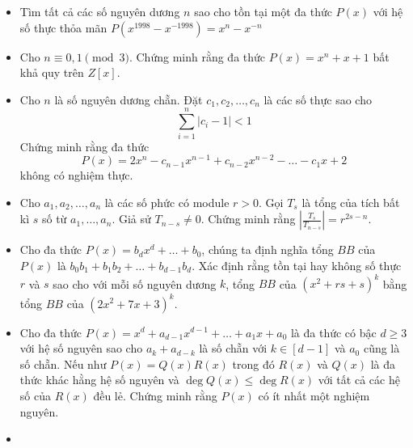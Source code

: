 \documentclass[11pt]{scrartcl}
\begin{document}
\begin{itemize}[label=, leftmargin=0em, itemsep=-0em]
        \item \begin{btvn}
            Tìm tất cả các số nguyên dương $n$ sao cho tồn tại một đa thức $P(x)$ với hệ số thực thỏa mãn $P(x^{1998} - x^{-1998}) = x^n - x^{-n}$
        \end{btvn}
        \item \begin{btvn}
            Cho $n \equiv 0,1 \pmod{3}$. Chứng minh rằng đa thức $P(x) = x^n + x + 1$ bất khả quy trên $Z[x]$.
        \end{btvn}
        \item \begin{btvn} Cho $n$ là số nguyên dương chẵn. Đặt $c_1,c_2,\dots,c_n$ là các số thực sao cho 
        \[
            \sum_{i = 1}^n |c_i - 1| < 1
        \]
        Chứng minh rằng đa thức 
        \[
            P(x) = 2x^n - c_{n - 1}x^{n - 1} + c_{n - 2}x^{n -2} -\dots-c_1x + 2
        \]
        không có nghiệm thực.
        \end{btvn}
        \item \begin{btvn}
            Cho $a_1,a_2,\dots,a_n$ là các số phức có module $r > 0$. Gọi $T_s$ là tổng của tích bất kì $s$ số từ $a_1,\dots,a_n$. Giả sử $T_{n - s} \neq 0$. Chứng minh rằng $\left|\frac{T_s}{T_{n - s}}\right| = r^{2s - n}$.
        \end{btvn}
        \item \begin{btvn}
            Cho đa thức $P(x) = b_dx^d + \dots + b_0$, chúng ta định nghĩa tổng $BB$ của $P(x)$ là $b_0b_1 + b_1b_2 +\dots+b_{d - 1}b_d$. Xác định rằng tồn tại hay không số thực $r$ và $s$ sao cho với mỗi số nguyên dương $k$, tổng $BB$ của $(x^2 + rs + s)^k$ bằng tổng $BB$ của $(2x^2 + 7x + 3)^k$.
        \end{btvn}
        \item \begin{btvn}
            Cho đa thức $P(x) = x^d + a_{d - 1}x^{ d- 1} + \dots + a_1x + a_0$ là đa thức có bậc $d \geq 3$ với hệ số nguyên sao cho $a_k + a_{d -k}$ là số chẵn với $k \in [d- 1]$ và $a_0$ cũng là số chẵn. Nếu như $P(x) = Q(x)R(x)$ trong đó $R(x)$ và $Q(x)$ là đa thức khác hằng hệ số nguyên và $\deg Q(x) \leq \deg R(x)$ với tất cả các hệ số của $R(x)$ đều lẻ. Chứng minh rằng $P(x)$ có ít nhất một nghiệm nguyên.
        \end{btvn}
        \item \begin{btvn}

\end{btvn}
\end{itemize}
\end{document}
